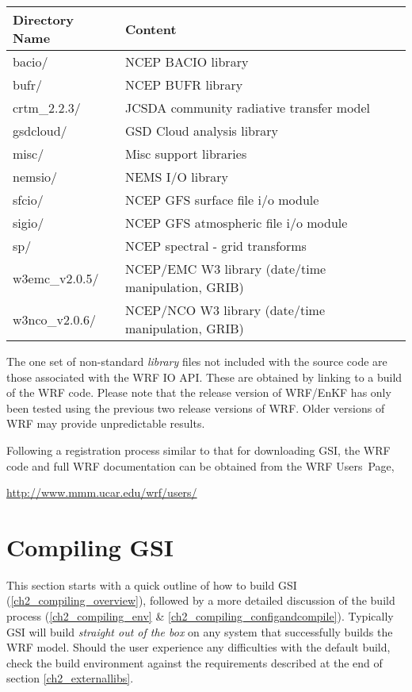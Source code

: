 \begin{table}[htbp]
\centering
\begin{tabular}{| l | l |}
\hline
\hline
Directory Name &  Content \\
\hline
bacio/  &  NCEP BACIO library  \\
\hline
bufr/   &  NCEP BUFR library  \\
\hline
crtm\_2.2.3/ &  JCSDA community radiative transfer model  \\
\hline
gsdcloud/   &  GSD Cloud analysis library  \\
\hline
misc/     &  Misc support libraries  \\
\hline
nemsio/  &  NEMS I/O library  \\
\hline
sfcio/  &  NCEP GFS surface file i/o module  \\
\hline
sigio/ &  NCEP GFS atmospheric file i/o module \\
\hline
sp/ &  NCEP spectral - grid transforms \\
\hline
w3emc\_v2.0.5/   &  NCEP/EMC W3 library (date/time manipulation, GRIB) \\
\hline
w3nco\_v2.0.6/  & NCEP/NCO W3 library (date/time manipulation, GRIB)  \\
\hline

\end{tabular}
\label{ch2_tble2}
\end{table} 

The one set of non-standard \textit{library} files not included with the source code are those associated with the WRF IO API. These are obtained by linking to a build of the WRF code. Please note that the release version of WRF/EnKF has only been tested using the previous two release versions of WRF. Older versions of WRF may provide unpredictable results.

Following a registration process similar to that for downloading GSI, the WRF code and full WRF documentation can be obtained from the WRF Users\textquotesingle \ Page,

\url{http://www.mmm.ucar.edu/wrf/users/}

\section{Compiling GSI} \label{ch2_compiling}

This section starts with a quick outline of how to build GSI (\ref{ch2_compiling_overview}), followed by a more detailed discussion of the build process (\ref{ch2_compiling_env} \& \ref{ch2_compiling_configandcompile}). Typically GSI will build \textit{straight out of the box} on any system that successfully builds the WRF model. Should the user experience any difficulties with the default build, check the build environment against the requirements described at the end of section \ref{ch2_externallibs}.

